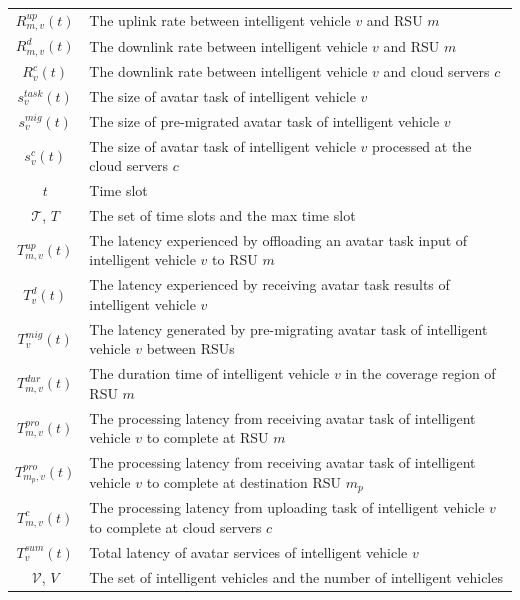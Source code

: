 \documentclass[lettersize,journal]{IEEEtran}
\begin{document}
\begin{table}[t]
\begin{threeparttable}
\begin{tabular}{c || p{6.5cm}}
        $R^{up}_{m,v}(t)$ &  The uplink rate between intelligent vehicle $v$ and RSU $m$ \\
		$R^{d}_{m,v}(t)$ &  The downlink rate between intelligent vehicle $v$ and RSU $m$ \\
		$R^{c}_{v}(t)$ & The downlink rate between intelligent vehicle $v$ and cloud servers $c$\\

		$s_v^{task}(t)$ & The size of avatar task of intelligent vehicle $v$\\ 
		$s^{mig}_v(t)$ & The size of pre-migrated avatar task of intelligent vehicle $v$\\
		$s^{c}_{v}(t)$ & The size of avatar task of intelligent vehicle $v$ processed at the cloud servers $c$\\
        $t$ & Time slot \\
        $\mathcal{T}$, $T$ & The set of time slots and the max time slot \\
		$T^{up}_{m,v}(t)$ & The latency experienced by offloading an avatar task input of intelligent vehicle $v$ to RSU $m$\\
		$T^{d}_{v}(t)$ & The latency experienced by receiving avatar task results of intelligent vehicle $v$\\
		$T^{mig}_{v}(t)$ & The latency generated by pre-migrating avatar task of intelligent vehicle $v$ between RSUs \\
		$T_{m,v}^{dur}(t)$ & The duration time of intelligent vehicle $v$ in the coverage region of RSU $m$\\
		$T^{pro}_{m,v}(t)$ & The processing latency from receiving avatar task of intelligent vehicle $v$ to complete at RSU $m$\\
        $T^{pro}_{m_p,v}(t)$ & The processing latency from receiving avatar task of intelligent vehicle $v$ to complete at destination RSU $m_{p}$\\
        $T^{c}_{m,v}(t)$ & The processing latency from uploading task of intelligent vehicle $v$ to complete at cloud servers $c$\\
		$T^{sum}_v(t)$ &Total latency of avatar services of intelligent vehicle $v$ \\
		$\mathcal{V}$, $V$ & The set of intelligent vehicles and the number of intelligent vehicles\\



		\hline
	\end{tabular}
	\end{threeparttable}
	\label{tab:shape-functions}
\end{table}
\end{document}
